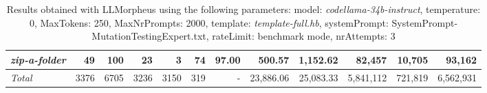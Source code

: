 \begin{table*}
{\begin{tabular}{l||r|r|r|r|r|r||r|r||r|r|r}
   \hline
   \textit{zip-a-folder} & 49 & 100 & 23 & 3 & 74 & 97.00 & 500.57 & 1,152.62 & 82,457 & 10,705 & 93,162 \\ 
   \hline
   \textit{Total} & 3376 & 6705 & 3236 & 3150 & 319 & - & 23,886.06  & 25,083.33 & 5,841,112 & 721,819 & 6,562,931 \\ 
 \end{tabular}
 }
 \caption{Results obtained with LLMorpheus using the following parameters: 
   model: \textit{codellama-34b-instruct}, 
   temperature: 0, 
   MaxTokens: 250, 
   MaxNrPrompts: 2000, 
   template: \textit{template-full.hb}, 
   systemPrompt: SystemPrompt-MutationTestingExpert.txt, 
   rateLimit: benchmark mode, 
   nrAttempts: 3  
 }
\end{table*}

